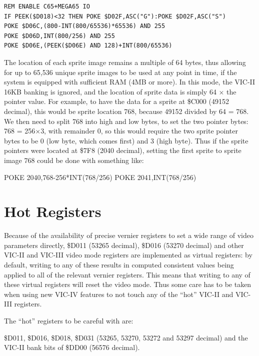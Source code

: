 \begin{tcolorbox}[colback=black,coltext=white]
\verbatimfont{\codefont}
\begin{verbatim}
REM ENABLE C65+MEGA65 IO
IF PEEK($D018)<32 THEN POKE $D02F,ASC("G"):POKE $D02F,ASC("S")
POKE $D06C,(800-INT(800/65536)*65536) AND 255
POKE $D06D,INT(800/256) AND 255
POKE $D06E,(PEEK($D06E) AND 128)+INT(800/65536)
\end{verbatim}
\end{tcolorbox}

The location of each sprite image remains a multiple of 64 bytes, thus allowing for up to 65,536 unique sprite images
to be used at any point in time, if the system is equipped with sufficient RAM (4MB or more).  In this mode, the VIC-II 16KB banking is ignored, and the location of sprite data is simply 64 $\times$ the pointer value.  For example, to have the data for a sprite at \$C000 (49152 decimal), this would be sprite location 768, because 49152 divided by 64 = 768.  We then need to split 768 into high and low bytes, to set the two pointer bytes: 768 = 256$\times$3, with remainder 0, so this would require the two sprite pointer bytes to be 0 (low byte, which comes first) and 3 (high byte).  Thus if the sprite pointers were located at \$7F8 (2040 decimal), setting the first sprite to sprite image 768 could be done with something like:

\begin{screenoutput}
POKE 2040,768-256*INT(768/256)
POKE 2041,INT(768/256)
\end{screenoutput}

\section{Hot Registers}

Because of the availability of precise vernier registers to set a wide
range of video parameters directly, \$D011 (53265 decimal), \$D016 (53270 decimal) and other VIC-II and
VIC-III video mode registers are implemented as virtual registers:
by default, writing to any of these results in computed consistent values being
applied to all of the relevant vernier registers.  This means that
writing to any of these virtual registers will reset the video mode.
Thus some care has to be taken when using new VIC-IV features to not
touch any of the ``hot'' VIC-II and VIC-III registers.

The ``hot'' registers to be careful with are:

\$D011, \$D016, \$D018, \$D031 (53265, 53270, 53272 and 53297 decimal) and the VIC-II bank bits of \$DD00 (56576 decimal).

